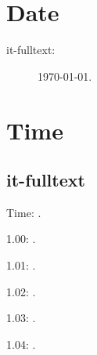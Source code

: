 \documentclass[italian]{article}
\begin{document}
\section{Date}

\begin{description}
\item[it-fulltext:]
\today.


\end{description}

\section{Time}
\subsection{it-fulltext}
Time: \DTMcurrenttime.

%
%
%
%
%
%
%
%
%
%
%
%
%
%
%
%
%
%
%
%
%
%
%
%
%
%
%
%

1.00:  .

1.01:  .

1.02:  .

1.03:  .

1.04:  .
\end{document}
